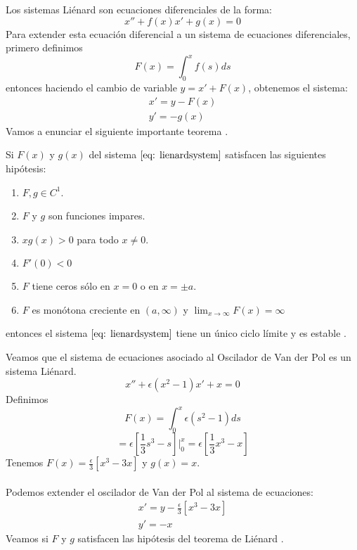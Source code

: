 Los sistemas Liénard son ecuaciones diferenciales de la forma:
\begin{equation}\label{eq: lienard}
	x''+f(x)x'+g(x)=0
\end{equation}
Para extender esta ecuación diferencial a un sistema de ecuaciones diferenciales, primero definimos
$$F(x)=\int_0^x f(s)ds$$
entonces haciendo el cambio de variable $y=x'+F(x)$, obtenemos el sistema:
\begin{equation}\label{eq: lienardsystem}
	\begin{matrix}
		x'=y-F(x) \\
		y'=-g(x)
	\end{matrix}
\end{equation}
Vamos a enunciar el siguiente importante teorema \cite{lienard1928oscillations}.
\begin{theorem}[Liénard]
	Si $F(x)$ y $g(x)$ del sistema $\eqref{eq: lienardsystem}$ satisfacen las siguientes hipótesis:
	\begin{enumerate}
		\item $F,g\in C^1$.
		\item $F$ y $g$ son funciones impares.
		\item $xg(x)>0$ para todo $x\neq 0$.
		\item $F'(0)<0$
		\item $F$ tiene ceros sólo en $x=0$ o en $x=\pm a$.
		\item $F$ es monótona creciente en $(a,\infty)$ y $\lim_{x\to\infty}F(x)=\infty$
	\end{enumerate}
	entonces el sistema $\eqref{eq: lienardsystem}$ tiene un único ciclo límite y es estable \cite{perko2001differential}.
\end{theorem}
Veamos que el sistema de ecuaciones asociado al Oscilador de Van der Pol es un sistema Liénard.
$$x''+\epsilon(x^2-1)x'+x=0$$
Definimos
$$F(x)=\int_0^x \epsilon(s^2-1)ds$$
$$=\epsilon[\frac{1}{3}s^3-s]\big|_0^x=\epsilon[\frac{1}{3}x^3-x]$$
Tenemos $F(x)=\frac{\epsilon}{3}[x^3-3x]$ y $g(x)=x$.\\
\\Podemos extender el oscilador de Van der Pol al sistema de ecuaciones:
$$
	\begin{matrix}
		x'=y-\frac{\epsilon}{3}[x^3-3x] \\
		y'=-x
	\end{matrix}
$$
Veamos si $F$ y $g$ satisfacen las hipótesis del teorema de Liénard \cite{guckenheimer1983nonlinear}.
